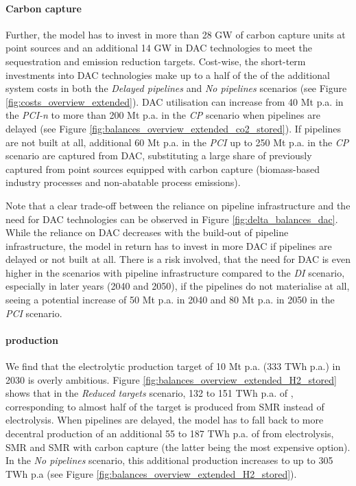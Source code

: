 \documentclass[preprint,12pt,sort&compress]{elsarticle}
\begin{document}
\paragraph{Carbon capture}
Further, the model has to invest in more than 28 GW of carbon capture units at point sources and an additional 14 GW in DAC technologies to meet the sequestration and emission reduction targets. Cost-wise, the short-term investments into DAC technologies make up to a half of the of the additional system costs in both the \textit{Delayed pipelines} and \textit{No pipelines} scenarios (see Figure \ref{fig:costs_overview_extended}). DAC utilisation can increase from 40 Mt p.a. in the \textit{PCI-n} to more than 200 Mt p.a. in the \textit{CP} scenario when pipelines are delayed (see Figure \ref{fig:balances_overview_extended_co2_stored}). If pipelines are not built at all, additional 60 Mt p.a. in the \textit{PCI} up to 250 Mt p.a. in the \textit{CP} scenario are captured from DAC, substituting a large share of  previously captured from point sources equipped with carbon capture (biomass-based industry processes and non-abatable process emissions).

Note that a clear trade-off between the reliance on pipeline infrastructure and the need for DAC technologies can be observed in Figure \ref{fig:delta_balances_dac}. While the reliance on DAC decreases with the build-out of pipeline infrastructure, the model in return has to invest in more DAC if pipelines are delayed or not built at all. There is a risk involved, that the need for DAC is even higher in the scenarios with pipeline infrastructure compared to the \textit{DI} scenario, especially in later years (2040 and 2050), if the pipelines do not materialise at all, seeing a potential increase of 50 Mt p.a. in 2040 and 80 Mt p.a. in 2050 in the \textit{PCI} scenario.
\paragraph{ production} 
We find that the electrolytic  production target of 10 Mt p.a. (333 TWh p.a.) in 2030 is overly ambitious. Figure \ref{fig:balances_overview_extended_H2_stored} shows that in the \textit{Reduced targets} scenario, 132 to 151 TWh p.a. of , corresponding to almost half of the target is produced from SMR instead of electrolysis. When pipelines are delayed, the model has to fall back to more decentral  production of an additional 55 to 187 TWh p.a. of  from electrolysis, SMR and SMR with carbon capture (the latter being the most expensive option). In the \textit{No pipelines} scenario, this additional  production increases to up to 305 TWh p.a (see Figure \ref{fig:balances_overview_extended_H2_stored}).
\end{document}
